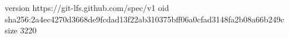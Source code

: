 version https://git-lfs.github.com/spec/v1
oid sha256:2a4ec4270d3668de9fcdad13f22ab310375bff06a0cfad3148fa2b08a66b249c
size 3220
